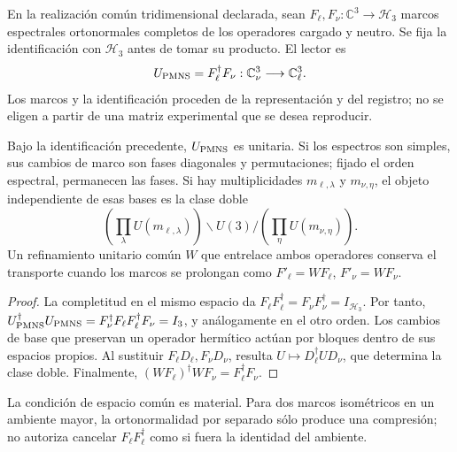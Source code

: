 \begin{definition}
En la realización común tridimensional declarada, sean
\(F_\ell,F_\nu:\mathbb C^3\to\mathcal H_3\) marcos espectrales
ortonormales completos de los operadores cargado y neutro. Se fija la
identificación con \(\mathcal H_3\) antes de tomar su producto. El lector es
\begin{equation}
 U_{\rm PMNS}=F_\ell^\dagger F_\nu:
 \mathbb C^3_\nu\longrightarrow\mathbb C^3_\ell.
 \label{ii:eq:ii-pmns-frames}
\end{equation}
Los marcos y la identificación proceden de la representación y del
registro; no se eligen a partir de una matriz experimental que se desea
reproducir.
\end{definition}

\begin{theorem}
Bajo la identificación precedente, \(U_{\rm PMNS}\) es unitaria.
Si los espectros son simples, sus cambios de marco son fases diagonales
y permutaciones; fijado el orden espectral, permanecen las fases.
Si hay multiplicidades \(m_{\ell,\lambda}\) y \(m_{\nu,\eta}\), el
objeto independiente de esas bases es la clase doble
\begin{equation}
 \left(\prod_\lambda U(m_{\ell,\lambda})\right)
 \backslash U(3) /
 \left(\prod_\eta U(m_{\nu,\eta})\right).
 \label{ii:eq:ii-pmns-double-class}
\end{equation}
Un refinamiento unitario común \(W\) que entrelace ambos operadores
conserva el transporte cuando los marcos se prolongan como
\(F'_\ell=WF_\ell\), \(F'_\nu=WF_\nu\).
\end{theorem}

\begin{proof}
La completitud en el mismo espacio da
\(F_\ell F_\ell^\dagger=F_\nu F_\nu^\dagger=I_{\mathcal H_3}\).
Por tanto,
\(U_{\rm PMNS}^\dagger U_{\rm PMNS}
=F_\nu^\dagger F_\ell F_\ell^\dagger F_\nu=I_3\), y análogamente
en el otro orden. Los cambios de base que preservan un operador hermítico
actúan por bloques dentro de sus espacios propios. Al sustituir
\(F_\ell D_\ell,F_\nu D_\nu\), resulta
\(U\mapsto D_\ell^\dagger UD_\nu\), que determina la clase doble.
Finalmente, \((WF_\ell)^\dagger WF_\nu=F_\ell^\dagger F_\nu\).
\end{proof}

La condición de espacio común es material. Para dos marcos isométricos en
un ambiente mayor, la ortonormalidad por separado sólo produce una
compresión; no autoriza cancelar \(F_\ell F_\ell^\dagger\) como si
fuera la identidad del ambiente.

